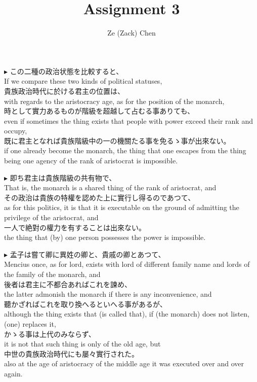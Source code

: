 \documentclass{ctexart}
\title{Assignment 3}
\author{Ze (Zack) Chen}
\makeatletter
\newcommand*{\shifttext}[1]{%
  \settowidth{\@tempdima}{#1}%
  \hspace{-\@tempdima}#1%
}
\newcommand{\plabel}[1]{%
\shifttext{\textbf{#1}\quad}%
}
\makeatother
\begin{document}
\maketitle

\plabel{$\blacktriangleright$}%
この二種の政治状態を比較すると、\\
If we compare these two kinds of political statuses,\\
貴族政治時代に於ける君主の位置は、\\
with regards to the aristocracy age, as for the position of the monarch,\\
時として實力あるものが階級を超越して占むる事ありても、\\
even if sometimes the thing exists that people with power exceed their rank and occupy,\\
既に君主となれば貴族階級中の一の機關たる事を免るゝ事が出來ない。\\
if one already become the monarch, the thing that one escapes from the thing being one agency of the rank of aristocrat is impossible.

\vspace{1em}
\plabel{$\blacktriangleright$}%
即ち君主は貴族階級の共有物で、\\
That is, the monarch is a shared thing of the rank of aristocrat, and\\
その政治は貴族の特權を認めた上に實行し得るのであつて、\\
as for this politics, it is that it is executable on the ground of admitting the privilege of the aristocrat, and \\
一人で絶對の權力を有することは出來ない。\\
the thing that (by) one person possesses the power is impossible.

\vspace{1em}
\plabel{$\blacktriangleright$}%
孟子は嘗て卿に異姓の卿と、貴戚の卿とあつて、\\
Mencius once, as for lord, exists with lord of different family name and lords of the family of the monarch, and\\
後者は君主に不都合あればこれを諫め、\\
the latter admonish the monarch if there is any inconvenience, and\\
聽かざればこれを取り換へるといへる事があるが、\\
although the thing exists that (is called that), if (the monarch) does not listen, (one) replaces it,\\
かゝる事は上代のみならず、\\
it is not that such thing is only of the old age, but\\
中世の貴族政治時代にも屡々實行された。\\
also at the age of aristocracy of the middle age it was executed over and over again.
\end{document}
